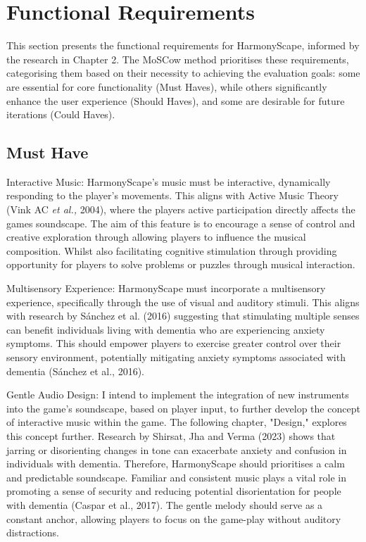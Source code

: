 \documentclass{l4proj}
\begin{document}
\section{Functional Requirements}
This section presents the functional requirements for HarmonyScape, informed by the research in Chapter 2. The MoSCow method prioritises these requirements, categorising them based on their necessity to achieving the evaluation goals: some are essential for core functionality (Must Haves), while others significantly enhance the user experience (Should Haves), and some are desirable for future iterations (Could Haves).

\subsection{Must Have}
Interactive Music: HarmonyScape's music must be interactive, dynamically responding to the player's movements. This aligns with Active Music Theory (Vink AC \emph{et al.,} 2004), where the players active participation directly affects the games soundscape. The aim of this feature is to encourage a sense of control and creative exploration through allowing players to influence the musical composition. Whilst also facilitating cognitive stimulation through providing opportunity for players to solve problems or puzzles through musical interaction.

Multisensory Experience: HarmonyScape must incorporate a multisensory experience, specifically through the use of visual and auditory stimuli. This aligns with research by Sánchez et al. (2016) suggesting that stimulating multiple senses can benefit individuals living with dementia who are experiencing anxiety symptoms. This should empower players to exercise greater control over their sensory environment, potentially mitigating anxiety symptoms associated with dementia (Sánchez et al., 2016).

Gentle Audio Design: I intend to implement the integration of new instruments into the game's soundscape, based on player input, to further develop the concept of interactive music within the game. The following chapter, "Design," explores this concept further. Research by Shirsat, Jha and Verma (2023) shows that jarring or disorienting changes in tone can exacerbate anxiety and confusion in individuals with dementia. Therefore, HarmonyScape should prioritises a calm and predictable soundscape. Familiar and consistent music plays a vital role in promoting a sense of security and reducing potential disorientation for people with dementia (Caspar et al., 2017). The gentle melody should serve as a constant anchor, allowing players to focus on the game-play without auditory distractions.
\end{document}
